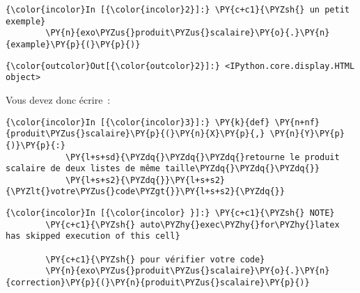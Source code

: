     \begin{Verbatim}[commandchars=\\\{\},frame=single,framerule=0.3mm,rulecolor=\color{cellframecolor}]
{\color{incolor}In [{\color{incolor}2}]:} \PY{c+c1}{\PYZsh{} un petit exemple}
        \PY{n}{exo\PYZus{}produit\PYZus{}scalaire}\PY{o}{.}\PY{n}{example}\PY{p}{(}\PY{p}{)}
\end{Verbatim}


\begin{Verbatim}[commandchars=\\\{\},frame=single,framerule=0.3mm,rulecolor=\color{cellframecolor}]
{\color{outcolor}Out[{\color{outcolor}2}]:} <IPython.core.display.HTML object>
\end{Verbatim}
            
    Vous devez donc écrire~:

    \begin{Verbatim}[commandchars=\\\{\},frame=single,framerule=0.3mm,rulecolor=\color{cellframecolor}]
{\color{incolor}In [{\color{incolor}3}]:} \PY{k}{def} \PY{n+nf}{produit\PYZus{}scalaire}\PY{p}{(}\PY{n}{X}\PY{p}{,} \PY{n}{Y}\PY{p}{)}\PY{p}{:} 
            \PY{l+s+sd}{\PYZdq{}\PYZdq{}\PYZdq{}retourne le produit scalaire de deux listes de même taille\PYZdq{}\PYZdq{}\PYZdq{}}
            \PY{l+s+s2}{\PYZdq{}}\PY{l+s+s2}{\PYZlt{}votre\PYZus{}code\PYZgt{}}\PY{l+s+s2}{\PYZdq{}}
\end{Verbatim}


    \begin{Verbatim}[commandchars=\\\{\},frame=single,framerule=0.3mm,rulecolor=\color{cellframecolor}]
{\color{incolor}In [{\color{incolor} }]:} \PY{c+c1}{\PYZsh{} NOTE}
        \PY{c+c1}{\PYZsh{} auto\PYZhy{}exec\PYZhy{}for\PYZhy{}latex has skipped execution of this cell}
        
        \PY{c+c1}{\PYZsh{} pour vérifier votre code}
        \PY{n}{exo\PYZus{}produit\PYZus{}scalaire}\PY{o}{.}\PY{n}{correction}\PY{p}{(}\PY{n}{produit\PYZus{}scalaire}\PY{p}{)}
\end{Verbatim}



    
    
    
